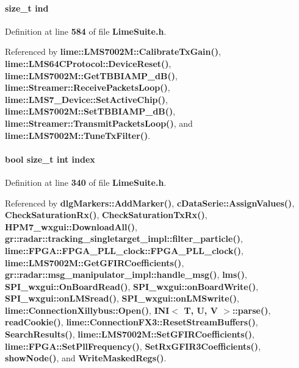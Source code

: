 \paragraph[{ind}]{\setlength{\rightskip}{0pt plus 5cm}size\+\_\+t ind}\label{group__FN__HIGH__LVL_ga454e87c3d8b7400aa865dc281f39c409}


Definition at line {\bf 584} of file {\bf Lime\+Suite.\+h}.



Referenced by {\bf lime\+::\+L\+M\+S7002\+M\+::\+Calibrate\+Tx\+Gain()}, {\bf lime\+::\+L\+M\+S64\+C\+Protocol\+::\+Device\+Reset()}, {\bf lime\+::\+L\+M\+S7002\+M\+::\+Get\+T\+B\+B\+I\+A\+M\+P\+\_\+d\+B()}, {\bf lime\+::\+Streamer\+::\+Receive\+Packets\+Loop()}, {\bf lime\+::\+L\+M\+S7\+\_\+\+Device\+::\+Set\+Active\+Chip()}, {\bf lime\+::\+L\+M\+S7002\+M\+::\+Set\+T\+B\+B\+I\+A\+M\+P\+\_\+d\+B()}, {\bf lime\+::\+Streamer\+::\+Transmit\+Packets\+Loop()}, and {\bf lime\+::\+L\+M\+S7002\+M\+::\+Tune\+Tx\+Filter()}.

\paragraph[{index}]{\setlength{\rightskip}{0pt plus 5cm}bool size\+\_\+t {\bf int} index}\label{group__FN__HIGH__LVL_ga69eaff271a229e3b1f15d41b48dc0c08}


Definition at line {\bf 340} of file {\bf Lime\+Suite.\+h}.



Referenced by {\bf dlg\+Markers\+::\+Add\+Marker()}, {\bf c\+Data\+Serie\+::\+Assign\+Values()}, {\bf Check\+Saturation\+Rx()}, {\bf Check\+Saturation\+Tx\+Rx()}, {\bf H\+P\+M7\+\_\+wxgui\+::\+Download\+All()}, {\bf gr\+::radar\+::tracking\+\_\+singletarget\+\_\+impl\+::filter\+\_\+particle()}, {\bf lime\+::\+F\+P\+G\+A\+::\+F\+P\+G\+A\+\_\+\+P\+L\+L\+\_\+clock\+::\+F\+P\+G\+A\+\_\+\+P\+L\+L\+\_\+clock()}, {\bf lime\+::\+L\+M\+S7002\+M\+::\+Get\+G\+F\+I\+R\+Coefficients()}, {\bf gr\+::radar\+::msg\+\_\+manipulator\+\_\+impl\+::handle\+\_\+msg()}, {\bf lms()}, {\bf S\+P\+I\+\_\+wxgui\+::\+On\+Board\+Read()}, {\bf S\+P\+I\+\_\+wxgui\+::on\+Board\+Write()}, {\bf S\+P\+I\+\_\+wxgui\+::on\+L\+M\+Sread()}, {\bf S\+P\+I\+\_\+wxgui\+::on\+L\+M\+Swrite()}, {\bf lime\+::\+Connection\+Xillybus\+::\+Open()}, {\bf I\+N\+I$<$ T, U, V $>$\+::parse()}, {\bf read\+Cookie()}, {\bf lime\+::\+Connection\+F\+X3\+::\+Reset\+Stream\+Buffers()}, {\bf Search\+Results()}, {\bf lime\+::\+L\+M\+S7002\+M\+::\+Set\+G\+F\+I\+R\+Coefficients()}, {\bf lime\+::\+F\+P\+G\+A\+::\+Set\+Pll\+Frequency()}, {\bf Set\+Rx\+G\+F\+I\+R3\+Coefficients()}, {\bf show\+Node()}, and {\bf Write\+Masked\+Regs()}.

